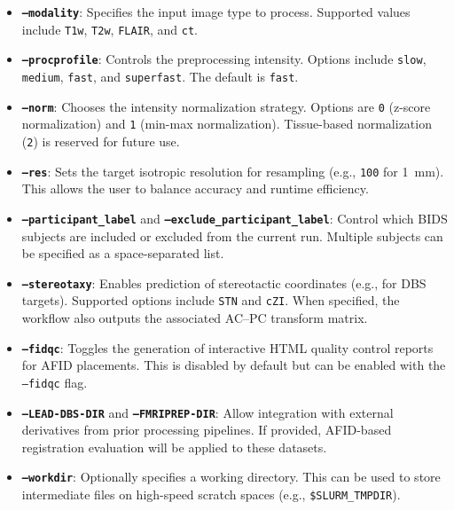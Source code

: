 \begin{itemize}
  \item \textbf{\texttt{--modality}}: Specifies the input image type to process. Supported values include \texttt{T1w}, \texttt{T2w}, \texttt{FLAIR}, and \texttt{ct}.
  
  \item \textbf{\texttt{--procprofile}}: Controls the preprocessing intensity. Options include \texttt{slow}, \texttt{medium}, \texttt{fast}, and \texttt{superfast}. The default is \texttt{fast}.
  
  \item \textbf{\texttt{--norm}}: Chooses the intensity normalization strategy. Options are \texttt{0} (z-score normalization) and \texttt{1} (min-max normalization). Tissue-based normalization (\texttt{2}) is reserved for future use.
  
  \item \textbf{\texttt{--res}}: Sets the target isotropic resolution for resampling (e.g., \texttt{100} for 1~mm). This allows the user to balance accuracy and runtime efficiency.
  
  \item \textbf{\texttt{--participant\_label}} and \textbf{\texttt{--exclude\_participant\_label}}: Control which BIDS subjects are included or excluded from the current run. Multiple subjects can be specified as a space-separated list.
  
  \item \textbf{\texttt{--stereotaxy}}: Enables prediction of stereotactic coordinates (e.g., for DBS targets). Supported options include \texttt{STN} and \texttt{cZI}. When specified, the workflow also outputs the associated AC–PC transform matrix.
  
  \item \textbf{\texttt{--fidqc}}: Toggles the generation of interactive HTML quality control reports for AFID placements. This is disabled by default but can be enabled with the \texttt{--fidqc} flag.
  
  \item \textbf{\texttt{--LEAD-DBS-DIR}} and \textbf{\texttt{--FMRIPREP-DIR}}: Allow integration with external derivatives from prior processing pipelines. If provided, AFID-based registration evaluation will be applied to these datasets.
  
  \item \textbf{\texttt{--workdir}}: Optionally specifies a working directory. This can be used to store intermediate files on high-speed scratch spaces (e.g., \texttt{\$SLURM\_TMPDIR}).
\end{itemize}

